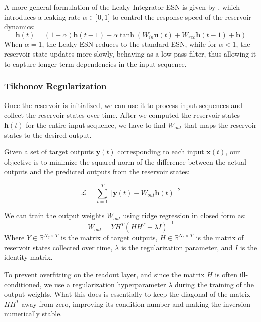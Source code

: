 A more general formulation of the Leaky Integrator ESN is given by \cite{JAEGER2007335}, which introduces a leaking rate $\alpha \in ]0,1]$ to control the response speed of the reservoir dynamics:
\begin{equation}
    \mathbf{h}(t) = (1 - \alpha) \mathbf{h}(t-1) + \alpha \tanh(W_{in}\mathbf{u}(t) + W_{rec}\mathbf{h}(t-1) + \mathbf{b})
\end{equation}
When $\alpha = 1$, the Leaky ESN reduces to the standard ESN, while for $\alpha < 1$, the reservoir state updates more slowly, behaving as a low-pass filter, thus allowing it to capture longer-term dependencies in the input sequence.
\subsubsection{Tikhonov Regularization}
 Once the reservoir is initialized, we can use it to process input sequences and collect the reservoir states over time.
After we computed the reservoir states $\mathbf{h}(t)$ for the entire input sequence, we have to find $W_{out}$ that maps the reservoir states to the desired output.
 
Given a set of target outputs $\mathbf{y}(t)$ corresponding to each input $\mathbf{x}(t)$, our objective is to minimize the squared norm of the difference between the actual outputs and the predicted outputs from the reservoir states:

 \begin{equation}
    \mathcal{L} = \sum_{t=1}^{T} ||\mathbf{y}(t) - W_{out} \mathbf{h}(t)||^2
\end{equation}

We can train the output weights $W_{out}$ using ridge regression in closed form as:
\begin{equation}
    W_{out} = Y H^T (H H^T + \lambda I)^{-1}
\end{equation}
Where $Y \in \mathbb{R}^{N_y \times T}$ is the matrix of target outputs, $H \in \mathbb{R}^{N_r \times T}$ is the matrix of reservoir states collected over time, $\lambda$ is the regularization parameter, and $I$ is the identity matrix.\newline

To prevent overfitting on the readout layer, and since the matrix $H$ is often ill-conditioned, we use a regularization hyperparameter $\lambda$ \cite{10.2307/1271436} during the training of the output weights.
What this does is essentially to keep the diagonal of the matrix $H H^T$ away from zero, improving its condition number and making the inversion numerically stable.
